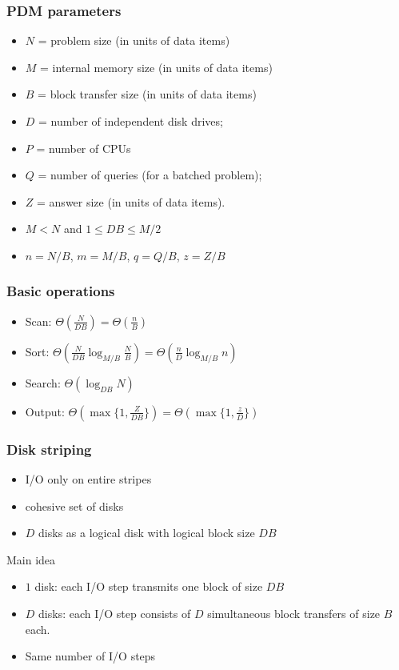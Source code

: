 \documentclass[12pt,aspectratio=169]{beamer}
\begin{document}
\begin{frame}\frametitle{PDM parameters}
  \begin{itemize}
  \item
    $N$ = problem size (in units of data items)
  \item
$M$ = internal memory size (in units of data items)
  \item
$B$ = block transfer size (in units of data items)
  \item
$D$ = number of independent disk drives;
  \item
$P$ = number of CPUs
\item
  $Q$ = number of queries (for a batched problem);
  \item
$Z$ = answer size (in units of data items).
  \item
    $M < N$ and $1 \le DB \le M/2$
  \item
    $n=N/B$, $m=M/B$, $q=Q/B$, $z=Z/B$
  \end{itemize}
\end{frame}


\begin{frame}\frametitle{Basic operations}
  \begin{itemize}
  \item
    Scan: $\Theta(\frac{N}{DB})=\Theta(\frac{n}{B})$
  \item
    Sort: $\Theta(\frac{N}{DB} \log_{M/B} \frac{N}{B}) = \Theta(\frac{n}{D} \log_{M/B} n)$
  \item
    Search: $\Theta(\log_{DB}N)$
  \item
    Output: $\Theta(\max\{1, \frac{Z}{DB}\}) = \Theta(\max\{1, \frac{z}{D}\})$
  \end{itemize}
\end{frame}


\begin{frame}\frametitle{Disk striping}
  \begin{itemize}
  \item
    I/O only on entire stripes
  \item
    cohesive set of disks
  \item
    $D$ disks as a logical disk with logical block size $DB$
  \end{itemize}
  \begin{block}{Main idea}
    \begin{itemize}
    \item
$1$ disk: each I/O step transmits one block of size $DB$
\item
$D$ disks: each I/O step consists of $D$
simultaneous block transfers of size $B$
each.
\item
  Same number of I/O steps
\end{itemize}
\end{block}
\end{frame}
\end{document}
